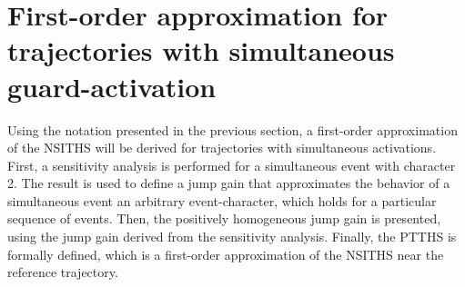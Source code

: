 \documentclass[../DC2017114Bouma.tex]{subfiles}
\begin{document}
%
%
%
%
%
%
%
%

\section{First-order approximation for trajectories with simultaneous guard-activation}
Using the notation presented in the previous section, a first-order approximation of the NSITHS will be derived for trajectories with simultaneous activations. First, a sensitivity analysis is performed for a simultaneous event with character 2. The result is used to define a jump gain that approximates the behavior of a simultaneous event an arbitrary event-character, which holds for a particular sequence of events. Then, the positively homogeneous jump gain is presented, using the jump gain derived from the sensitivity analysis. Finally, the PTTHS is formally defined, which is a first-order approximation of the NSITHS near the reference trajectory.
\end{document}
